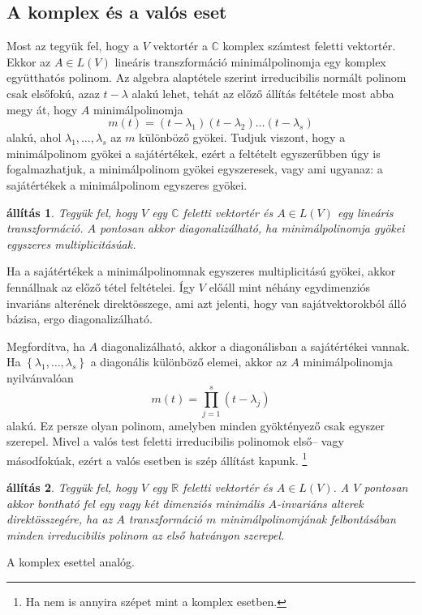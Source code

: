 \documentclass[9pt, a4paper, showtrims]{memoir}
\makeatletter
\renewenvironment{proof}[1][\proofname]
    {\par\pushQED{\qed}%
    \normalfont \topsep6\p@\@plus6\p@\relax
    \trivlist
    \item[\hskip\labelsep
        \itshape
    #1\@addpunct{:}]\ignorespaces}
    {\popQED\endtrivlist\@endpefalse}
\theoremstyle{plain}
\newtheorem{proposition}{állítás}[chapter]
\theoremstyle{remark}
\theoremstyle{definition}
\makeatother
\begin{document}
    \subsection{A komplex és a valós eset}
    Most az tegyük fel, hogy a $V$ vektortér a $\mathbb{C}$ komplex számtest feletti vektortér.
    Ekkor az $A\in L\left( V \right)$ lineáris transzformáció minimálpolinomja egy komplex együtthatós polinom.
    Az algebra alaptétele szerint irreducibilis normált polinom csak elsőfokú, azaz $t-\lambda$ alakú lehet,
    tehát az előző állítás feltétele most abba megy át, hogy $A$ minimálpolinomja
    \[
        m\left( t \right)=\left( t-\lambda_1 \right)\left( t-\lambda_2 \right)\dots\left( t-\lambda_s \right)
    \]
    alakú, ahol $\lambda_1,\dots,\lambda_s$ az $m$ különböző gyökei.
    Tudjuk viszont, hogy a minimálpolinom gyökei a sajátértékek,
    ezért a feltételt egyszerűbben úgy is fogalmazhatjuk,
    a minimálpolinom gyökei egyszeresek, vagy ami ugyanaz: 
    a sajátértékek a minimálpolinom egyszeres gyökei.
    \begin{proposition}
        Tegyük fel, hogy $V$ egy $\mathbb{C}$ feletti vektortér és $A\in L\left( V \right)$ egy lineáris transzformáció.
        $A$ pontosan akkor diagonalizálható,
        ha minimálpolinomja gyökei egyszeres multiplicitásúak.
    \end{proposition}
    \begin{proof}
        Ha a sajátértékek a minimálpolinomnak egyszeres multiplicitású gyökei,
        akkor fennállnak az előző tétel feltételei.
        Így $V$ előáll mint néhány egydimenziós invariáns alterének direktösszege,
        ami azt jelenti, hogy van sajátvektorokból álló bázisa, ergo diagonalizálható.

        Megfordítva, ha $A$ diagonalizálható, akkor a diagonálisban a sajátértékei vannak.
        Ha $\left\{ \lambda_1,\dots,\lambda_s \right\}$ a diagonális különböző elemei,
        akkor az $A$ minimálpolinomja nyilvánvalóan
        \[
            m\left( t \right)
            =
            \prod_{j=1}^s\left( t-\lambda_j \right)
        \]
        alakú.
        Ez persze olyan polinom, 
        amelyben minden gyöktényező csak egyszer szerepel.
    \end{proof}
    Mivel a valós test feletti irreducibilis polinomok első-- vagy másodfokúak, 
    ezért a valós esetben is szép állítást kapunk.
    \footnote{Ha nem is annyira szépet mint a komplex esetben.}
    \begin{proposition}
        Tegyük fel, hogy $V$ egy $\mathbb{R}$ feletti vektortér és $A\in L\left( V \right)$.
        A $V$ pontosan akkor bontható fel egy vagy két dimenziós minimális $A$-invariáns alterek direktösszegére,
        ha az $A$ transzformáció $m$ 
        minimálpolinomjának felbontásában minden irreducibilis polinom az első hatványon szerepel.
    \end{proposition}
    \begin{proof}
        A komplex esettel analóg.
    \end{proof}
\end{document}

